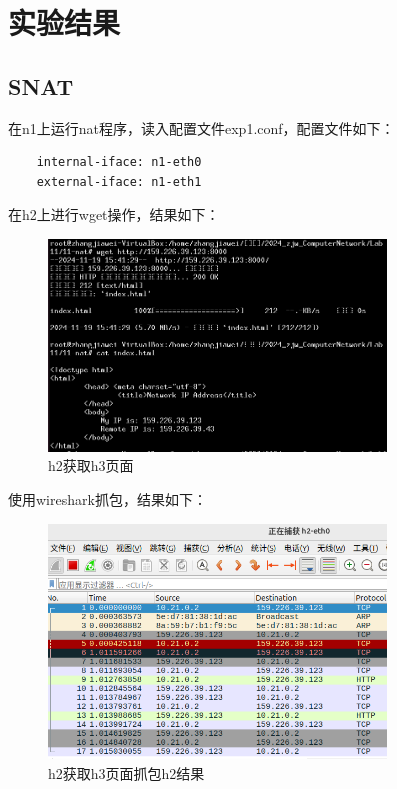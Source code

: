 \documentclass[UTF8]{report}
\begin{document}
\section{实验结果}

\subsection{SNAT}

在n1上运行nat程序，读入配置文件exp1.conf，配置文件如下：

\begin{lstlisting}
    internal-iface: n1-eth0
    external-iface: n1-eth1
\end{lstlisting}

在h2上进行wget操作，结果如下：

\begin{figure}[H]
    \centering
    \includegraphics[width=0.8\textwidth]{snat_html_h2.png}
    \caption{h2获取h3页面}
\end{figure}

使用wireshark抓包，结果如下：

\begin{figure}[H]
    \centering
    \includegraphics[width=0.8\textwidth]{snat_ws_h2.png}
    \caption{h2获取h3页面抓包h2结果}
\end{figure}
\end{document}
